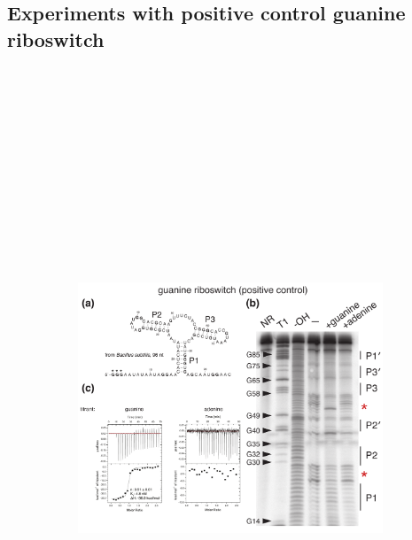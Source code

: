 \documentclass[12pt]{report}
\begin{document}
\subsection{Experiments with positive control guanine riboswitch}
\begin{figure}[h]
	\begin{subfigure}{1\textwidth}
		\center
		\includegraphics[width=6.5in, height=8in,keepaspectratio]{figures/figure_S3.pdf}	
	\end{subfigure}
	

\end{figure}
\end{document}
